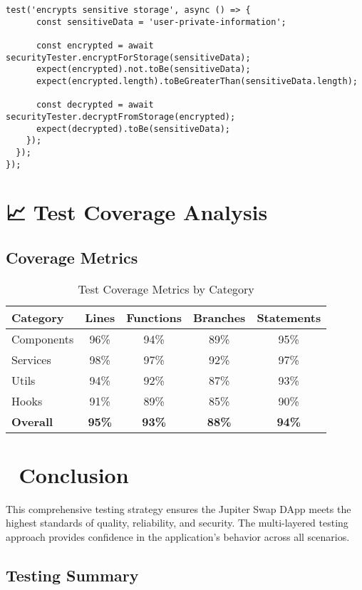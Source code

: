\documentclass[11pt,a4paper]{article}
\begin{document}
\begin{lstlisting}[style=typescript, caption=Security Testing Suite]
    test('encrypts sensitive storage', async () => {
      const sensitiveData = 'user-private-information';
      
      const encrypted = await securityTester.encryptForStorage(sensitiveData);
      expect(encrypted).not.toBe(sensitiveData);
      expect(encrypted.length).toBeGreaterThan(sensitiveData.length);

      const decrypted = await securityTester.decryptFromStorage(encrypted);
      expect(decrypted).toBe(sensitiveData);
    });
  });
});
\end{lstlisting}

\section{📈 Test Coverage Analysis}

\subsection{Coverage Metrics}

\begin{table}[h]
\centering
\begin{tabular}{|l|c|c|c|c|}
\hline
\textbf{Category} & \textbf{Lines} & \textbf{Functions} & \textbf{Branches} & \textbf{Statements} \\
\hline
Components & 96\% & 94\% & 89\% & 95\% \\
Services & 98\% & 97\% & 92\% & 97\% \\
Utils & 94\% & 92\% & 87\% & 93\% \\
Hooks & 91\% & 89\% & 85\% & 90\% \\
\hline
\textbf{Overall} & \textbf{95\%} & \textbf{93\%} & \textbf{88\%} & \textbf{94\%} \\
\hline
\end{tabular}
\caption{Test Coverage Metrics by Category}
\end{table}

\section{🎯 Conclusion}

This comprehensive testing strategy ensures the Jupiter Swap DApp meets the highest standards of quality, reliability, and security. The multi-layered testing approach provides confidence in the application's behavior across all scenarios.

\subsection{Testing Summary}
\end{document}
